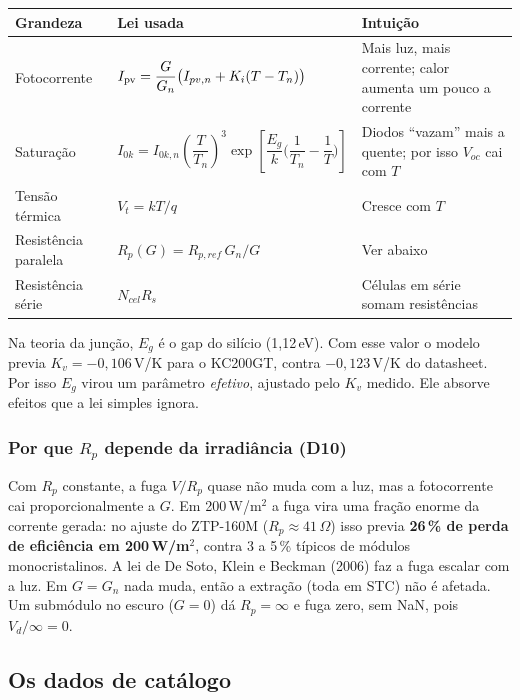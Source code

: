 \begin{center}\small
\begin{tabularx}{\textwidth}{@{}l>{\raggedright\arraybackslash}p{6.4cm}>{\raggedright\arraybackslash}X@{}}
\toprule
Grandeza & Lei usada & Intui\c{c}\~ao \\ \midrule
Fotocorrente & $I_{\mathrm{pv}}=\dfrac{G}{G_n}\big(I_{pv,n}+K_i(T-T_n)\big)$ & Mais luz, mais corrente; calor aumenta um pouco a corrente \\[6pt]
Satura\c{c}\~ao & $I_{0k}=I_{0k,n}\left(\dfrac{T}{T_n}\right)^{3}\exp\!\left[\dfrac{E_g}{k}\Big(\dfrac1{T_n}-\dfrac1T\Big)\right]$ & Diodos ``vazam'' mais a quente; por isso $V_{oc}$ cai com $T$ \\[8pt]
Tens\~ao t\'ermica & $V_t=kT/q$ & Cresce com $T$ \\
Resist\^encia paralela & $R_p(G)=R_{p,ref}\,G_n/G$ & Ver abaixo \\
Resist\^encia s\'erie & $N_{cel}R_s$ & C\'elulas em s\'erie somam resist\^encias \\
\bottomrule
\end{tabularx}
\end{center}

\begin{atencao}
Na teoria da jun\c{c}\~ao, $E_g$ \'e o gap do sil\'icio (1,12\,eV). Com esse valor o modelo previa
$K_v=-0{,}106$\,V/K para o KC200GT, contra $-0{,}123$\,V/K do datasheet. Por isso $E_g$ virou um
par\^ametro \emph{efetivo}, ajustado pelo $K_v$ medido. Ele absorve efeitos que a lei simples
ignora.
\end{atencao}

\subsubsection{Por que $R_p$ depende da irradi\^ancia (D10)}

Com $R_p$ constante, a fuga $V/R_p$ quase n\~ao muda com a luz, mas a fotocorrente cai
proporcionalmente a $G$. Em 200\,W/m$^2$ a fuga vira uma fra\c{c}\~ao enorme da corrente gerada:
no ajuste do ZTP-160M ($R_p\approx41\,\Omega$) isso previa \textbf{26\,\% de perda de efici\^encia
em 200\,W/m$^2$}, contra 3 a 5\,\% t\'ipicos de m\'odulos monocristalinos. A lei de De Soto, Klein
e Beckman (2006) faz a fuga escalar com a luz. Em $G=G_n$ nada muda, ent\~ao a extra\c{c}\~ao
(toda em STC) n\~ao \'e afetada. Um subm\'odulo no escuro ($G=0$) d\'a $R_p=\infty$ e fuga zero,
sem NaN, pois $V_d/\infty=0$.

\subsection{Os dados de cat\'alogo}

